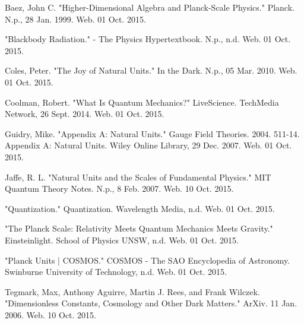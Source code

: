 \documentclass[paper=a4, fontsize=12pt]{scrartcl} %
\numberwithin{equation}{section} %
\numberwithin{figure}{section} %
\numberwithin{table}{section} %
\begin{document}
\newpage
\begin{thebibliography}
[[1] Baez, John C. "Higher-Dimensional Algebra and Planck-Scale Physics." Planck. N.p., 28 Jan. 1999. Web. 01 Oct. 2015.

\vspace{0.3cm}
\newline [2] "Blackbody Radiation." - The Physics Hypertextbook. N.p., n.d. Web. 01 Oct. 2015.

\vspace{0.3cm}
\newline [3] Coles, Peter. "The Joy of Natural Units." In the Dark. N.p., 05 Mar. 2010. Web. 01 Oct. 2015.

\vspace{0.3cm}
\newline [4] Coolman, Robert. "What Is Quantum Mechanics?" LiveScience. TechMedia Network, 26 Sept. 2014. Web. 01 Oct. 2015.

\vspace{0.3cm}
\newline [5] Guidry, Mike. "Appendix A: Natural Units." Gauge Field Theories. 2004. 511-14. Appendix A: Natural Units. Wiley Online Library, 29 Dec. 2007. Web. 01 Oct. 2015.

\vspace {0.1cm}
\newline [6] Jaffe, R. L. "Natural Units and the Scales of Fundamental Physics." MIT Quantum Theory Notes. N.p., 8 Feb. 2007. Web. 10 Oct. 2015.

\vspace{0.3cm}
\newline [7] "Quantization." Quantization. Wavelength Media, n.d. Web. 01 Oct. 2015.

\vspace{0.3cm}
\newline [8] "The Planck Scale: Relativity Meets Quantum Mechanics Meets Gravity." Einsteinlight. School of Physics UNSW, n.d. Web. 01 Oct. 2015.

\vspace{0.3cm}
\newline [9] "Planck Units | COSMOS." COSMOS - The SAO Encyclopedia of Astronomy. Swinburne University of Technology, n.d. Web. 01 Oct. 2015.

\vspace{0.3cm}
\newline [10] Tegmark, Max, Anthony Aguirre, Martin J. Rees, and Frank Wilczek. "Dimensionless Constants, Cosmology and Other Dark Matters." ArXiv. 11 Jan. 2006. Web. 10 Oct. 2015.

\end{thebibliography}
\end{document}
